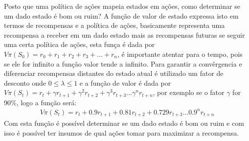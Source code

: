 Posto que uma política de ações mapeia estados em ações, como determinar se um dado estado é bom ou ruim?
A função de valor de estado expressa isto em termos de recompensas e a política de ações, basicamente representa
uma recompensa a receber em um dado estado mais as recompensas futuras se seguir uma certa política de ações, esta
funça é dada por $V\pi(S_{0})= r_{0}+r_{1}+r_{2}+r_{3}+ ... + r_{n}$, é importante atentar para o tempo, pois 
se ele for infinito a função valor tende a infinito. Para garantir a convêrgencia e diferenciar recompensas distantes do
estado atual é utilizado um fator de desconto onde $0 \leqslant \lambda \leqslant 1$  e a função de valor é dada por
$V\pi(S_{t})= r_{t} + \gamma r_{t+1} + \gamma^{2} r_{t+2} + \gamma^{3} r_{t+3} ... \gamma^{n} r_{t+n}$, por exemplo
se o fator $\gamma$ for 90\%, logo a função será:
\begin{equation}
	\begin{aligned}
 			V\pi(S_{t})= r_{t} + 0.9 r_{t+1} + 0.81 r_{t+2} + 0.729 r_{t+3} ... 0.9^{n} r_{t+n}
	\end{aligned}
\end{equation}
Com esta função é possível determinar se um dado estado é bom ou ruim e com isso é possível ter insumos de qual
ações tomar para maximizar a recompensa.